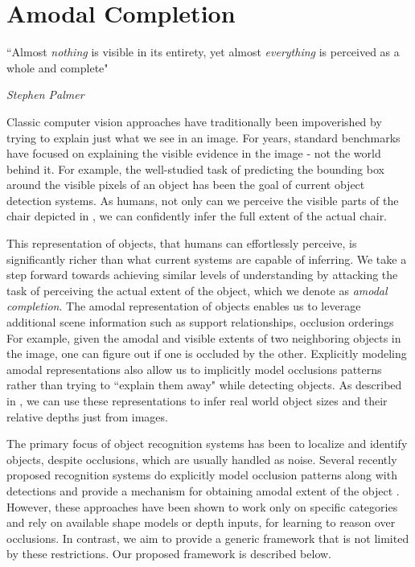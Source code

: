 \section{Amodal Completion}
\setlength{\epigraphwidth}{.9\textwidth}
\epigraph{``Almost \textit{nothing} is visible in its entirety, yet almost \textit{everything} is perceived as a whole and complete"}{\textit{Stephen Palmer}}

Classic computer vision approaches have traditionally been impoverished by trying to explain just what we see in an image. For years, standard benchmarks have focused on explaining the visible evidence in the image - not the world behind it. For example, the well-studied task of predicting the bounding box around the visible pixels of an object has been the goal of current object detection systems. As humans, not only can we perceive the visible parts of the chair depicted in , we can confidently infer the full extent of the actual chair.

This representation of objects, that humans can effortlessly perceive, is significantly richer than what current systems are capable of inferring. We take a step forward towards achieving similar levels of understanding by attacking the task of perceiving the actual extent of the object, which we denote as \textit{amodal completion}. The amodal representation of objects enables us to leverage additional scene information such as support relationships, occlusion orderings \etc For example, given the amodal and visible extents of two neighboring objects in the image, one can figure out if one is occluded by the other. Explicitly modeling amodal representations also allow us to implicitly model occlusions patterns rather than trying to ``explain them away" while detecting objects. As described in , we can use these representations to infer real world object sizes and their relative depths just from images.

The primary focus of object recognition systems \cite{girshick2013rich,felzens_latent_pami10} has been to localize and identify objects, despite occlusions, which are usually handled as noise. Several recently proposed recognition systems do explicitly model occlusion patterns along with detections and provide a mechanism for obtaining amodal extent of the object \cite{ghiasi2014parsing, xiang_cvpr15, zia2014towards}. However, these approaches have been shown to work only on specific categories and rely on available shape models or depth inputs, for learning to reason over occlusions. In contrast, we aim to provide a generic framework that is not limited by these restrictions. Our proposed framework is described below.

